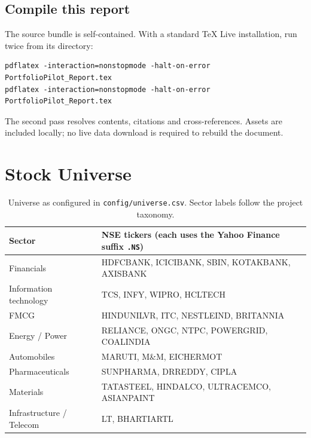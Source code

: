 \documentclass[12pt,a4paper]{article}
\newcommand{\newsec}[1]{\section{#1}}
\begin{document}
\subsection{Compile this report}
The source bundle is self-contained. With a standard TeX Live installation, run twice from its directory:
\begin{lstlisting}
pdflatex -interaction=nonstopmode -halt-on-error PortfolioPilot_Report.tex
pdflatex -interaction=nonstopmode -halt-on-error PortfolioPilot_Report.tex
\end{lstlisting}
The second pass resolves contents, citations and cross-references. Assets are included locally; no live data download is required to rebuild the document.

\newsec{Stock Universe}\label{app:universe}
\begin{table}[H]\centering\small
\begin{tabularx}{\linewidth}{@{}p{34mm}Y@{}}\toprule
Sector & NSE tickers (each uses the Yahoo Finance suffix \texttt{.NS})\\\midrule
Financials & HDFCBANK, ICICIBANK, SBIN, KOTAKBANK, AXISBANK\\
Information technology & TCS, INFY, WIPRO, HCLTECH\\
FMCG & HINDUNILVR, ITC, NESTLEIND, BRITANNIA\\
Energy / Power & RELIANCE, ONGC, NTPC, POWERGRID, COALINDIA\\
Automobiles & MARUTI, M\&M, EICHERMOT\\
Pharmaceuticals & SUNPHARMA, DRREDDY, CIPLA\\
Materials & TATASTEEL, HINDALCO, ULTRACEMCO, ASIANPAINT\\
Infrastructure / Telecom & LT, BHARTIARTL\\\bottomrule
\end{tabularx}
\caption{Universe as configured in \texttt{config/universe.csv}. Sector labels follow the project taxonomy.}
\end{table}
\end{document}
